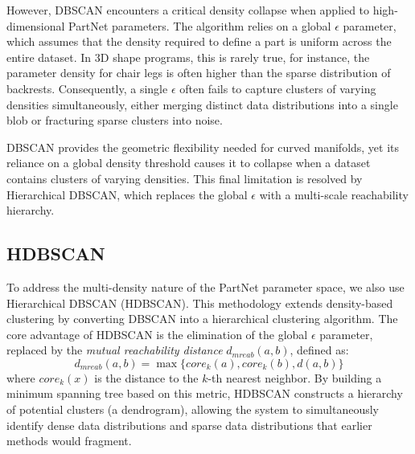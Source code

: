 \documentclass{thesis}
\begin{document}
However, DBSCAN encounters a critical density collapse when applied to high-dimensional PartNet parameters. The algorithm relies on a global $\epsilon$ parameter, which assumes that the density required to define a part is uniform across the entire dataset. In 3D shape programs, this is rarely true, for instance, the parameter density for chair legs is often higher than the sparse distribution of backrests. Consequently, a single $\epsilon$ often fails to capture clusters of varying densities simultaneously, either merging distinct data distributions into a single blob or fracturing sparse clusters into noise.

DBSCAN provides the geometric flexibility needed for curved manifolds, yet its reliance on a global density threshold causes it to collapse when a dataset contains clusters of varying densities. This final limitation is resolved by Hierarchical DBSCAN, which replaces the global $\epsilon$ with a multi-scale reachability hierarchy.

\subsection{HDBSCAN}

To address the multi-density nature of the PartNet parameter space, we also use Hierarchical DBSCAN (HDBSCAN). This methodology extends density-based clustering by converting DBSCAN into a hierarchical clustering algorithm. The core advantage of HDBSCAN is the elimination of the global $\epsilon$ parameter, replaced by the \textit{mutual reachability distance} $d_{mreab}(a, b)$, defined as:
\begin{equation}
    d_{mreab}(a, b) = \max \{ core_k(a), core_k(b), d(a, b) \}
\end{equation}
where $core_k(x)$ is the distance to the $k$-th nearest neighbor. By building a minimum spanning tree based on this metric, HDBSCAN constructs a hierarchy of potential clusters (a dendrogram), allowing the system to simultaneously identify dense data distributions and sparse data distributions that earlier methods would fragment.
\end{document}
